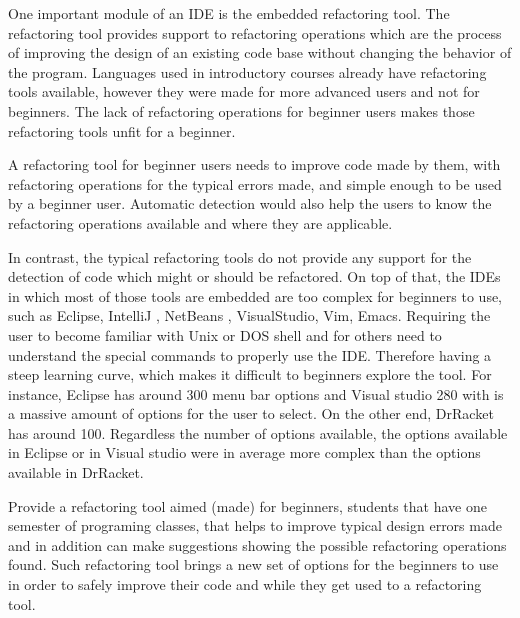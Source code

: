 One important module of an IDE is the embedded refactoring tool. %
The refactoring tool provides support to refactoring operations which are the process of improving the design
of an existing code base \cite{fowler1999refactoring} without changing the behavior of the program.
Languages used in introductory courses already have refactoring tools available,
however they were made for more advanced users and not for beginners.
The lack of refactoring operations for beginner users makes those refactoring tools
unfit for a beginner.

A refactoring tool for beginner users needs to improve code made by them, %
with refactoring operations for the typical errors made, and simple enough to be
used by a beginner user.
Automatic detection would also help the users to know the refactoring operations
available and where they are applicable.

In contrast, the typical refactoring tools do not provide any support for the detection of code which might or should %
be refactored.
On top of that, the IDEs in which most of those tools are embedded are too complex for beginners
to use, such as Eclipse\cite{carlson2005eclipse}, IntelliJ \cite{bock2011intellij}, NetBeans \cite{boudreau2002netbeans},
 VisualStudio, Vim\cite{moolenaar2008vim}, Emacs\cite{stallman2007gnu}.
Requiring the user to become familiar with Unix or DOS shell and for others need to
understand the special commands to properly use the IDE. %
Therefore having a steep learning curve, which makes it difficult to beginners
explore the tool. %
For instance, Eclipse has around 300 menu bar options and Visual studio 280 with is a massive amount
of options for the user to select.
On the other end, DrRacket has around 100. %
Regardless the number of options available, the options available in Eclipse or
in Visual studio were in average more complex than the options available in DrRacket.

Provide a refactoring tool aimed (made) for beginners, students that have one semester %
of programing classes, that helps to improve typical design errors made and in addition can
make suggestions showing the possible refactoring operations found.
Such refactoring tool brings a new set of options for the beginners to use
in order to safely improve their code and while they get used to a refactoring tool.


